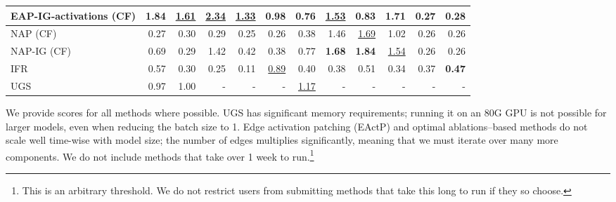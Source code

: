 \documentclass{article}
\theoremstyle{plain}
\theoremstyle{definition}
\theoremstyle{remark}
\begin{document}
\begin{table}[t]
{\begin{tabular}{lrrrrrrrrrrr}
    EAP-IG-activations (CF) & 1.84 & \underline{1.61} & \underline{2.34} & \underline{1.33} & \textbf{0.98} & 0.76 & \underline{1.53} & 0.83 & \textbf{1.71} & 0.27 & 0.28 \\
    \midrule
    NAP (CF) & 0.27 & 0.30 & 0.29 & 0.25 & 0.26 & 0.38 & 1.46 & \underline{1.69} & 1.02 & 0.26 & 0.26 \\
    NAP-IG (CF) &  0.69 & 0.29 & 1.42 & 0.42 & 0.38 & 0.77 & \textbf{1.68} & \textbf{1.84} & \underline{1.54} & 0.26 & 0.26 \\
    \midrule
    IFR & 0.57 & 0.30 & 0.25 & 0.11 & \underline{0.89} & 0.40 & 0.38 & 0.51 & 0.34 & 0.37 & \textbf{0.47} \\
    \midrule
    UGS & 0.97 & 1.00 & - & - & - & \underline{1.17} & - & - & - & - & - \\
    \bottomrule
    \end{tabular}}
    \label{tab:subgraph_fplus_private}
\end{table}



We provide scores for all methods where possible. UGS has significant memory requirements; running it on an 80G GPU is not possible for larger models, even when reducing the batch size to 1. Edge activation patching (EActP) and optimal ablations--based methods do not scale well time-wise with model size; the number of edges multiplies significantly, meaning that we must iterate over many more components. We do not include methods that take over 1 week to run.\footnote{This is an arbitrary threshold. We do not restrict users from submitting methods that take this long to run if they so choose.}
\end{document}
